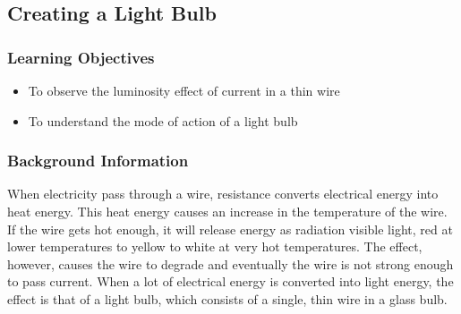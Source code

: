 

\subsection{Creating a Light Bulb}

\subsubsection*{Learning Objectives}
\begin{itemize}
\item{To observe the luminosity effect of current in a thin wire}
\item{To understand the mode of action of a light bulb}
\end{itemize}

\subsubsection*{Background Information}
When electricity pass through a wire, resistance converts electrical energy into heat energy. This heat energy causes an increase in the temperature of the wire. If the wire gets hot enough, it will release energy as radiation visible light, red at lower temperatures to yellow to white at very hot temperatures. The effect, however, causes the wire to degrade and eventually the wire is not strong enough to pass current.  When a lot of electrical energy is converted into light energy, the effect is that of a light bulb, which consists of a single, thin wire in a glass bulb.


